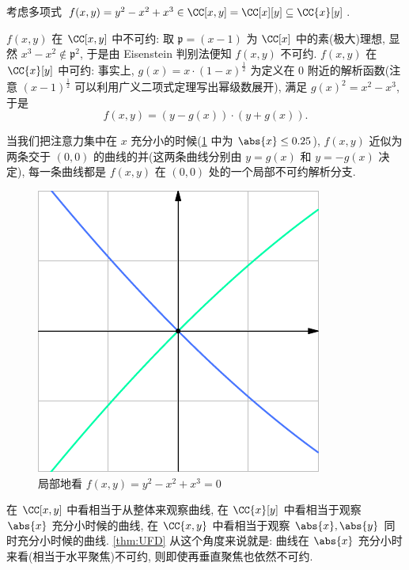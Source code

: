 \begin{exmp}
考虑多项式 $f(x,y) = y^2 - x^2 + x^3 \in \CC[x,y] = \CC[x][y] \subseteq \CC\{x\}[y]$.
\begin{itemize}
    \ii $f(x,y)$ 在 $\CC[x,y]$ 中不可约:
    取 $\mathfrak{p} = (x-1)$ 为 $\CC[x]$ 中的素(极大)理想,
    显然 $x^3 - x^2 \notin \mathfrak{p}^2$,
    于是由 Eisenstein 判别法便知 $f(x,y)$ 不可约.
    \ii $f(x,y)$ 在 $\CC\{x\}[y]$ 中可约:
    事实上, $g(x) = x\cdot(1-x)^{\frac{1}{2}}$ 为定义在 $0$ 附近的解析函数(注意
    $(x-1)^{\frac{1}{2}}$ 可以利用广义二项式定理写出幂级数展开),
    满足 $g(x)^2 = x^2 - x^3$, 于是
    \[f(x,y) = (y-g(x))\cdot (y+g(x)).\]
\end{itemize}
当我们把注意力集中在 $x$ 充分小的时候(\cref{fig:local-seeing} 中为 $\abs{x} \le 0.25$),
$f(x,y)$ 近似为两条交于 $(0,0)$ 的曲线的并(这两条曲线分别由 $y = g(x)$ 和 $y = -g(x)$ 决定),
每一条曲线都是 $f(x,y)$ 在 $(0,0)$ 处的一个局部不可约解析分支.
\begin{figure}[H]
    \centering
    \includegraphics[scale = 1]{fig-04.pdf}
    \caption{局部地看 $f(x,y) = y^2 - x^2 + x^3 = 0$}
    \label{fig:local-seeing}
\end{figure}
\end{exmp}

\begin{rem}
在 $\CC[x,y]$ 中看相当于从整体来观察曲线,
在 $\CC\{x\}[y]$ 中看相当于观察 $\abs{x}$ 充分小时候的曲线,
在 $\CC\{x,y\}$ 中看相当于观察 $\abs{x},\abs{y}$ 同时充分小时候的曲线.
\cref{thm:UFD} 从这个角度来说就是:
曲线在 $\abs{x}$ 充分小时来看(相当于水平聚焦)不可约,
则即使再垂直聚焦也依然不可约.
\end{rem}

